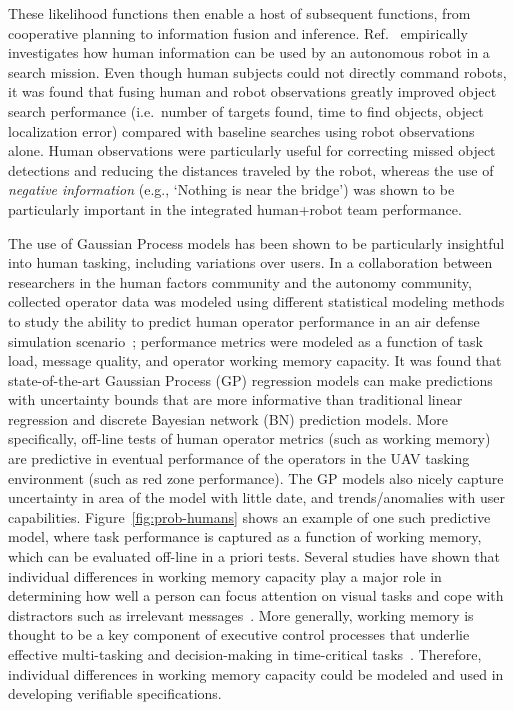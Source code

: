 These likelihood functions then enable a host of subsequent functions, from cooperative planning to information fusion and inference. Ref.~\cite{Ahmed10SigPro} empirically investigates how human information can be used by an autonomous robot in a search mission. Even though  human subjects could not directly command robots, it was found that fusing human and robot observations greatly improved object search performance (i.e.\ number of targets found, time to find objects, object localization error) compared with baseline searches using robot observations alone. Human observations were particularly useful for correcting missed object detections and reducing the distances traveled by the robot, whereas the use of \textit{negative information} (e.g., `Nothing is near the bridge') was shown to be particularly important in the integrated human+robot team performance.

The use of Gaussian Process models has been shown to be particularly insightful into human tasking, including variations over users. In a collaboration between researchers in the human factors community and the autonomy community, collected operator data was modeled using different statistical modeling methods to study the ability to predict human operator performance in an  air defense simulation scenario~\cite{Ahmed2013a}; performance metrics were modeled as a function of task load, message quality, and operator working memory capacity. It was found that state-of-the-art Gaussian Process (GP) regression models can make predictions with uncertainty bounds that are more informative than traditional linear regression and discrete Bayesian network (BN) prediction models. More specifically, off-line tests of human operator metrics (such as working memory) are predictive in eventual performance of the operators in the UAV tasking environment (such as red zone performance). The GP models also nicely capture uncertainty in area of the model with little date, and trends/anomalies with user capabilities. Figure~\ref{fig:prob-humans} shows an example of one such predictive model, where task performance is captured as a function of working memory, which can be evaluated off-line in a priori tests. Several studies have shown that individual differences in working memory capacity play a major role in determining how well a person can focus attention on visual tasks and cope with distractors such as irrelevant messages~\cite{Engle02}. More generally, working memory is thought to be a key component of executive control processes that underlie effective multi-tasking and decision-making in time-critical tasks~\cite{Parasuraman2010,Endsley95}. Therefore, individual differences in working memory capacity could be modeled and used in developing verifiable specifications. 

